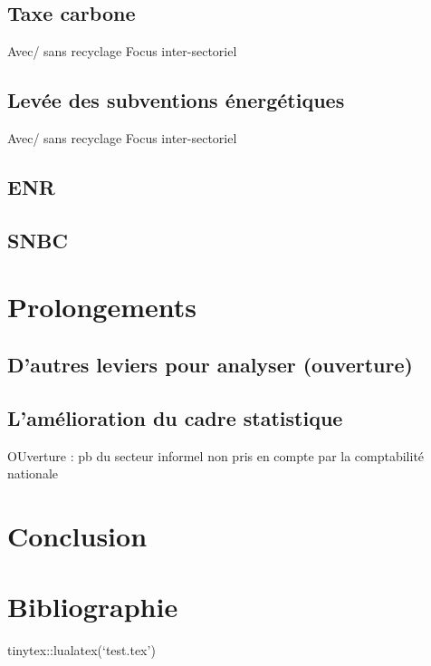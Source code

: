 \documentclass[
]{article}
\begin{document}
\hypertarget{taxe-carbone-1}{%
\subsection{Taxe carbone}\label{taxe-carbone-1}}

Avec/ sans recyclage Focus inter-sectoriel

\hypertarget{levuxe9e-des-subventions-uxe9nerguxe9tiques}{%
\subsection{Levée des subventions
énergétiques}\label{levuxe9e-des-subventions-uxe9nerguxe9tiques}}

Avec/ sans recyclage Focus inter-sectoriel

\hypertarget{enr}{%
\subsection{ENR}\label{enr}}

\hypertarget{snbc}{%
\subsection{SNBC}\label{snbc}}

\hypertarget{prolongements}{%
\section{Prolongements}\label{prolongements}}

\hypertarget{dautres-leviers-pour-analyser-ouverture}{%
\subsection{D'autres leviers pour analyser
(ouverture)}\label{dautres-leviers-pour-analyser-ouverture}}

\hypertarget{lamuxe9lioration-du-cadre-statistique}{%
\subsection{L'amélioration du cadre
statistique}\label{lamuxe9lioration-du-cadre-statistique}}

OUverture : pb du secteur informel non pris en compte par la
comptabilité nationale

\hypertarget{conclusion}{%
\section{Conclusion}\label{conclusion}}

\hypertarget{bibliographie}{%
\section{Bibliographie}\label{bibliographie}}

tinytex::lualatex(`test.tex')

\printbibliography
\end{document}
